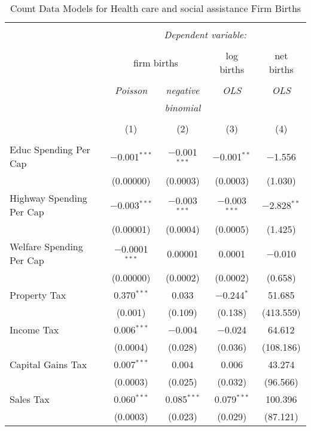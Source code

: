 
\begin{table}[!htbp] \centering 
  \caption{Count Data Models for Health care and social assistance Firm Births} 
  \label{} 
\begin{tabular}{@{\extracolsep{5pt}}lcccc} 
\\[-1.8ex]\hline 
\hline \\[-1.8ex] 
 & \multicolumn{4}{c}{\textit{Dependent variable:}} \\ 
\cline{2-5} 
\\[-1.8ex] & \multicolumn{2}{c}{firm births} & log births & net births \\ 
\\[-1.8ex] & \textit{Poisson} & \textit{negative} & \textit{OLS} & \textit{OLS} \\ 
 & \textit{} & \textit{binomial} & \textit{} & \textit{} \\ 
\\[-1.8ex] & (1) & (2) & (3) & (4)\\ 
\hline \\[-1.8ex] 
 Educ Spending Per Cap & $-$0.001$^{***}$ & $-$0.001$^{***}$ & $-$0.001$^{**}$ & $-$1.556 \\ 
  & (0.00000) & (0.0003) & (0.0003) & (1.030) \\ 
  Highway Spending Per Cap  & $-$0.003$^{***}$ & $-$0.003$^{***}$ & $-$0.003$^{***}$ & $-$2.828$^{**}$ \\ 
  & (0.00001) & (0.0004) & (0.0005) & (1.425) \\ 
  Welfare Spending Per Cap  & $-$0.0001$^{***}$ & 0.00001 & 0.0001 & $-$0.010 \\ 
  & (0.00000) & (0.0002) & (0.0002) & (0.658) \\ 
  Property Tax & 0.370$^{***}$ & 0.033 & $-$0.244$^{*}$ & 51.685 \\ 
  & (0.001) & (0.109) & (0.138) & (413.559) \\ 
  Income Tax & 0.006$^{***}$ & $-$0.004 & $-$0.024 & 64.612 \\ 
  & (0.0004) & (0.028) & (0.036) & (108.186) \\ 
  Capital Gains Tax & 0.007$^{***}$ & 0.004 & 0.006 & 43.274 \\ 
  & (0.0003) & (0.025) & (0.032) & (96.566) \\ 
  Sales Tax & 0.060$^{***}$ & 0.085$^{***}$ & 0.079$^{***}$ & 100.396 \\ 
  & (0.0003) & (0.023) & (0.029) & (87.121) \\ 

\end{tabular}
\end{table}
